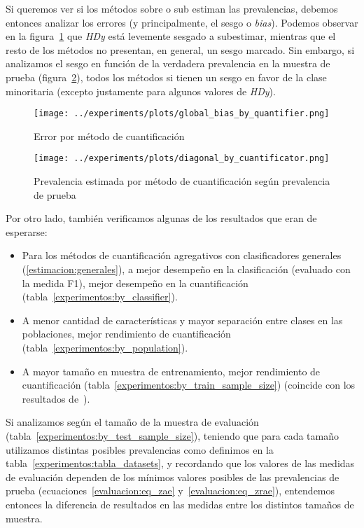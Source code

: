 Si queremos ver si los métodos sobre o sub estiman las prevalencias, debemos
entonces analizar los errores (y principalmente, el sesgo o {\it bias\/}).
Podemos observar en la figura~\ref{fig:global_bias_by_quantifier} que {\it
HDy\/} está levemente sesgado a subestimar, mientras que el resto de los métodos
no presentan, en general, un sesgo marcado. Sin embargo, si analizamos el sesgo
en función de la verdadera prevalencia en la muestra de prueba
(figura~\ref{fig:diagonal_by_cuantificator}), todos los métodos si tienen un
sesgo en favor de la clase minoritaria (excepto justamente para algunos valores
de {\it HDy\/}).

\begin{figure}[!tph]
    \centering
    \centerline{\texttt{[image: ../experiments/plots/global\_bias\_by\_quantifier.png]}}
    \caption{Error por método de
    cuantificación}\label{fig:global_bias_by_quantifier}
\end{figure}
\begin{figure}[!tph]
    \centering
    \centerline{\texttt{[image: ../experiments/plots/diagonal\_by\_cuantificator.png]}}
    \caption{Prevalencia estimada por método de cuantificación según prevalencia
    de prueba}\label{fig:diagonal_by_cuantificator}
\end{figure}

Por otro lado, también verificamos algunas de los resultados que eran de
esperarse:
\begin{itemize}[noitemsep]
    \item Para los métodos de cuantificación agregativos con clasificadores
    generales (\ref{estimacion:generales}), a mejor desempeño en la
    clasificación (evaluado con la medida F1), mejor desempeño en la
    cuantificación (tabla~\ref{experimentos:by_classifier}).
    \item A menor cantidad de características y mayor separación entre clases en
    las poblaciones, mejor rendimiento de cuantificación
    (tabla~\ref{experimentos:by_population}).
    \item A mayor tamaño en muestra de entrenamiento, mejor rendimiento de
    cuantificación (tabla~\ref{experimentos:by_train_sample_size}) (coincide con
    los resultados de~\citet{schumacher2021comparative}).
\end{itemize}

Si analizamos según el tamaño de la muestra de evaluación
(tabla~\ref{experimentos:by_test_sample_size}), teniendo que para cada tamaño
utilizamos distintas posibles prevalencias como definimos en la
tabla~\ref{experimentos:tabla_datasets}, y recordando que los valores de las
medidas de evaluación dependen de los mínimos valores posibles de las
prevalencias de prueba (ecuaciones~\ref{evaluacion:eq_zae}
y~\ref{evaluacion:eq_zrae}), entendemos entonces la diferencia de resultados en
las medidas entre los distintos tamaños de muestra.

